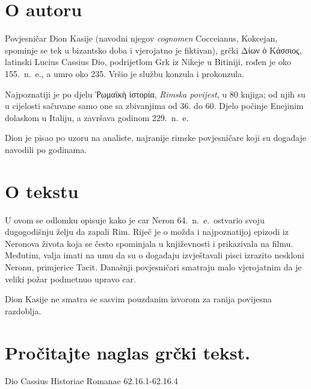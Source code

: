 \section*{O autoru}

Povjesničar Dion Kasije (navodni njegov \textit{cognomen} Cocceianus, Kokcejan, spominje se tek u bizantsko doba i vjerojatno je fiktivan), grčki \textgreek[variant=ancient]{Δίων ὁ Κάσσιος,} latinski Lucius Cassius Dio, podrijetlom Grk iz Nikeje u Bitiniji, rođen je oko 155.\ n.~e., a umro oko 235. Vršio je službu konzula i prokonzula.

Najpoznatiji je po djelu \textgreek[variant=ancient]{Ῥωμαϊκὴ ἱστορία}, \textit{Rimska povijest}, u 80 knjiga; od njih su u cijelosti sačuvane samo one sa zbivanjima od 36. do 60. Djelo počinje Enejinim dolaskom u Italiju, a završava godinom 229.\ n.~e. 

Dion je pisao po uzoru na analiste, najranije rimske povjesničare koji su događaje navodili po godinama.

\section*{O tekstu}

U ovom se odlomku opisuje kako je car Neron 64.\ n.~e.\ ostvario svoju dugogodišnju želju da zapali Rim. Riječ je o možda i najpoznatijoj epizodi iz Neronova života koja se često spominjala u književnosti i prikazivala na filmu. Međutim, valja imati na umu da su o događaju izvještavali pisci izrazito neskloni Neronu, primjerice Tacit. Današnji povjesničari smatraju malo vjerojatnim da je veliki požar podmetnuo upravo car.

Dion Kasije ne smatra se sasvim pouzdanim izvorom za ranija povijesna razdoblja. 

\newpage

\section*{Pročitajte naglas grčki tekst.}

Dio Cassius Historiae Romanae 62.16.1-62.16.4

\medskip


